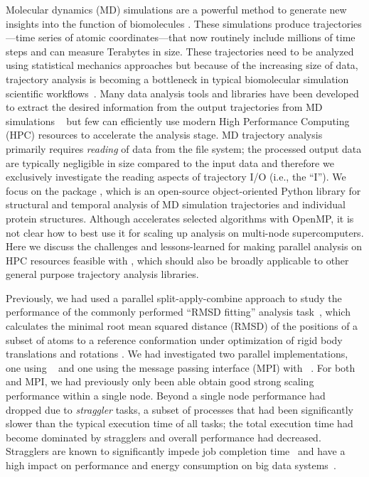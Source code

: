 \label{sec:introduction}
Molecular dynamics (MD) simulations are a powerful method to generate new insights into the function of biomolecules \citep{Borhani:2012mi, Dror:2012cr, Orozco:2014dq, Perilla:2015kx, Bottaro:2018aa}.
These simulations produce trajectories---time series of atomic coordinates---that now routinely include millions of time steps and can measure Terabytes in size.
These trajectories need to be analyzed using statistical mechanics approaches \cite{Tuckerman:2010cr, Mura:2014kx} but because of the increasing size of data, trajectory analysis is becoming a bottleneck in typical biomolecular simulation scientific workflows~\cite{Cheatham:2015}.
Many data analysis tools and libraries have been developed to extract the desired information from the output trajectories from MD simulations ~\cite{nmoldyn, nmoldyn-2012, Hum96, Hinsen:2000kx, Grant:2006ud, himach-2008, Romo:2009zr, Romo:2014bh, Michaud-Agrawal:2011fu, Gowers:2016aa, cpptraj-2013, mdtraj-2015, pteros2015, Doerr:2016aa} but few can efficiently use modern High Performance Computing (HPC) resources to accelerate the analysis stage.
MD trajectory analysis primarily requires \emph{reading} of data from the file system; the processed output data are typically negligible in size compared to the input data and therefore we exclusively investigate the reading aspects of trajectory I/O (i.e., the ``I'').
We focus on the  package \cite{Gowers:2016aa,Michaud-Agrawal:2011fu}, which is an open-source object-oriented Python library for structural and temporal analysis of MD simulation trajectories and individual protein structures.
Although  accelerates selected algorithms with OpenMP, it is not clear how to best use it for scaling up analysis on multi-node supercomputers.
Here we discuss the challenges and lessons-learned for making parallel analysis on HPC resources feasible with , which should also be broadly applicable to other general purpose trajectory analysis libraries.

Previously, we had used a parallel split-apply-combine  approach to study the performance of the commonly performed ``RMSD fitting'' analysis task~\cite{Khoshlessan:2017ab, ICCP-2018}, which calculates the minimal root mean squared distance (RMSD) of the positions of a subset of atoms to a reference conformation under optimization of rigid body translations and rotations \cite{Liu:2010kx, Lea96, Mura:2014kx}.
We had investigated two parallel implementations, one using ~\cite{Rocklin:2015aa} and one using the message passing interface (MPI) with ~\cite{Dalcin:2011aa, Dalcin:2005aa}. 
For both  and MPI, we had previously only been able obtain good strong scaling performance within a single node.
Beyond a single node performance had dropped due to \emph{straggler} tasks, a subset of processes that had been significantly slower than the typical execution time of all tasks; the total execution time had become dominated by stragglers and overall performance had decreased.
Stragglers are known to significantly impede job completion time~\cite{Garraghan2016} and have a high impact on performance and energy consumption on big data systems~\cite{Tien-2017}.

